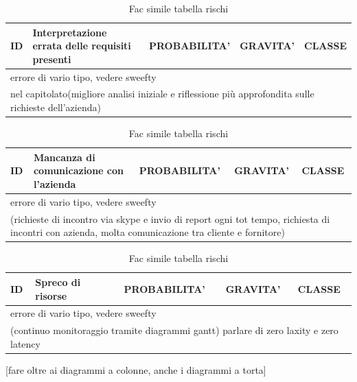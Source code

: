 	\begin{table}[H]
		\centering
		\begin{tabularx}{\columnwidth}{|m{1.5cm}|m{4.2cm}|m{2.7cm}|m{2.7cm}|m{2.7cm}|}
			\hline
			ID & 
			Interpretazione errata delle requisiti presenti & 
			PROBABILITA' & 
			GRAVITA' & 
			CLASSE\\
			\hline
			\multicolumn{5}{|X|}{
				errore di vario tipo, vedere sweefty
			}\\
			\hline
			\multicolumn{5}{|X|}{
				{nel capitolato}(migliore analisi iniziale e riflessione più approfondita sulle richieste dell'azienda)
			}\\
			\hline
		\end{tabularx}
		\caption{Fac simile tabella rischi}
	\end{table}
	
	\begin{table}[H]
		\centering
		\begin{tabularx}{\columnwidth}{|m{1.5cm}|m{4.2cm}|m{2.7cm}|m{2.7cm}|m{2.7cm}|}
			\hline
			ID & 
			Mancanza di comunicazione con l'azienda & 
			PROBABILITA' & 
			GRAVITA' & 
			CLASSE\\
			\hline
			\multicolumn{5}{|X|}{
				errore di vario tipo, vedere sweefty
			}\\
			\hline
			\multicolumn{5}{|X|}{
				 (richieste di incontro via skype e invio di report ogni tot tempo, richiesta di incontri con azienda, molta comunicazione tra cliente e fornitore)
			}\\
			\hline
		\end{tabularx}
		\caption{Fac simile tabella rischi}
	\end{table} 	

	\begin{table}[H]
		\centering
		\begin{tabularx}{\columnwidth}{|m{1.5cm}|m{4.2cm}|m{2.7cm}|m{2.7cm}|m{2.7cm}|}
			\hline
			ID & 
			Spreco di risorse & 
			PROBABILITA' & 
			GRAVITA' & 
			CLASSE\\
			\hline
			\multicolumn{5}{|X|}{
				errore di vario tipo, vedere sweefty
			}\\
			\hline
			\multicolumn{5}{|X|}{
					 (continuo monitoraggio tramite diagrammi gantt) parlare di zero laxity e zero latency
			}\\
			\hline
		\end{tabularx}
		\caption{Fac simile tabella rischi}
	\end{table} 
	
	[fare oltre ai diagrammi a colonne, anche i diagrammi a torta]
	
